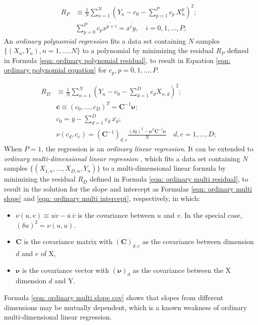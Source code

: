 \documentclass[twoside]{article}
\numberwithin{equation}{section}
\begin{document}
\begin{align}
\label{eqn: ordinary polynomial residual}
R_P &\equiv \frac{1}{N} \sum_{n=1}^N (Y_n - c_0 - \sum_{p=1}^{P} c_p\, X_n^p)^2; \\
\label{eqn: ordinary polynomial equation}
&\sum_{p=0}^{P} c_p \overline{x^{p+i}} = \overline{x^i y}, \quad i = 0, 1, \dots, P;
\end{align}
An \emph{ordinary polynomial regression} \cite{Statistical_Methods, Probability_Statistics, Numerical_Recipes} fits a data set containing $N$ samples $\{(X_n, Y_n), n = 1, \dots, N\}$ to a polynomial by minimizing the residual $R_P$ defined in Formula \eqref{eqn: ordinary polynomial residual}, to result in Equation \eqref{eqn: ordinary polynomial equation} for $c_p,  p = 0, 1, \dots, P$.

\begin{align}
\label{eqn: ordinary multi residual}
R_D &\equiv \frac{1}{N} \sum_{n=1}^N \left(Y_n - c_0 - \sum_{d=1}^{D} c_d X_{n, d}\right)^2; \\
\label{eqn: ordinary multi slope}
&\boldsymbol{c} \equiv (c_0, \dots, c_D)^T = \mathbf{C}^{-1} \boldsymbol{\nu}; \\
\label{eqn: ordinary multi intercept}
&c_0 = \overline{y} - \sum_{d=1}^{D} c_d\, \overline{x_d}; \\
\label{eqn: ordinary multi slope cov}
&\nu(c_d, c_e) = (\mathbf{C}^{-1})_{d,e} \frac{(\delta y)^2 - \boldsymbol{\nu}^T \mathbf{C}^{-1} \boldsymbol{\nu}}{N} \quad d, e = 1, \dots, D;
\end{align}
When $P=1$, the regression is an \emph{ordinary linear regression}.
It can be extended to \emph{ordinary multi-dimensional linear regression} \cite{Statistical_Methods, Probability_Statistics, Numerical_Recipes}, which fits a data set containing $N$ samples $\{(X_{1, n}, \dots, X_{D, n}, Y_n)\}$ to a multi-dimensional linear formula by minimizing the residual $R_D$ defined in Formula \eqref{eqn: ordinary multi residual}, to result in the solution for the slope and intercept as Formulas \eqref{eqn: ordinary multi slope} and \eqref{eqn: ordinary multi intercept}, respectively, in which:
\begin{itemize}
\item $\nu(u, v) \equiv \overline{u v} - \overline{u}\, \overline{v}$ is the covariance between $u$ and $v$.
In the special case, $(\delta u)^2 = \nu(u, u)$.

\item $\mathbf{C}$ is the covariance matrix with $(\mathbf{C})_{d,e}$ as the covariance between dimension $d$ and $e$ of X,

\item  $\boldsymbol{\nu}$ is the covariance vector with $(\boldsymbol{\nu})_d$ as the covariance between the X dimension $d$ and Y.
\end{itemize}
Formula \eqref{eqn: ordinary multi slope cov} shows that slopes from different dimensions may be mutually dependent, which is a known weakness of ordinary multi-dimensional linear regression. 
\end{document}
